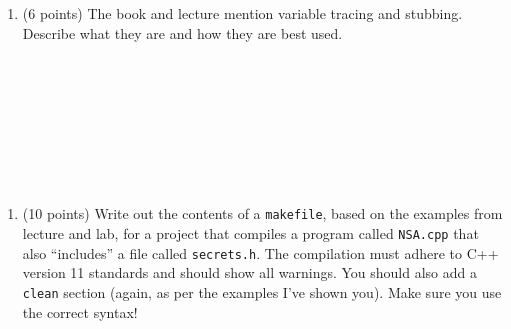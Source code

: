 \documentclass[
]{article}
\providecommand{\tightlist}{%
  \setlength{\itemsep}{0pt}\setlength{\parskip}{0pt}}
\begin{document}
\begin{enumerate}
\def\labelenumi{\arabic{enumi}.}
\setcounter{enumi}{7}
\tightlist
\item
  (6 points) The book and lecture mention variable tracing and stubbing.
  Describe what they are and how they are best used.
\end{enumerate}

\begin{verbatim}









\end{verbatim}

\pagebreak

\begin{enumerate}
\def\labelenumi{\arabic{enumi}.}
\setcounter{enumi}{8}
\tightlist
\item
  (10 points) Write out the contents of a \texttt{makefile}, based on
  the examples from lecture and lab, for a project that compiles a
  program called \texttt{NSA.cpp} that also ``includes'' a file called
  \texttt{secrets.h}. The compilation must adhere to C++ version 11
  standards and should show all warnings. You should also add a
  \texttt{clean} section (again, as per the examples I've shown you).
  Make sure you use the correct syntax!
\end{enumerate}

\begin{verbatim}











\end{verbatim}
\end{document}
